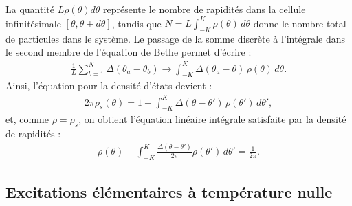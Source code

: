 La quantité \( L \rho(\theta) d\theta \) représente le nombre de rapidités dans la cellule infinitésimale \( [\theta, \theta + d\theta] \), tandis que
\(
	N = L \int_{-K}^{K} \rho(\theta)\, d\theta
\)
donne le nombre total de particules dans le système. Le passage de la somme discrète à l'intégrale dans le second membre de l'équation de Bethe permet d’écrire :
\begin{eqnarray*}
	\frac{1}{L} \sum_{b = 1}^N \Delta(\theta_a - \theta_b) \longrightarrow \int_{-K}^{K} \Delta(\theta_a - \theta)\, \rho(\theta)\, d\theta.
\end{eqnarray*}
Ainsi, l'équation pour la densité d'états devient :
\begin{eqnarray}\label{chap.1.rho.s.2}
	2\pi \rho_s(\theta) = 1 + \int_{-K}^{K} \Delta(\theta - \theta')\, \rho(\theta')\, d\theta',
\end{eqnarray}
et, comme \( \rho = \rho_s \), on obtient l’équation linéaire intégrale satisfaite par la densité de rapidités :
\begin{eqnarray}\label{chap.1.rho.3}
	\rho(\theta) - \int_{-K}^{K} \frac{\Delta(\theta - \theta')}{2\pi} \rho(\theta')\, d\theta' = \frac{1}{2\pi}.
\end{eqnarray}


\subsection{Excitations élémentaires à température nulle}



